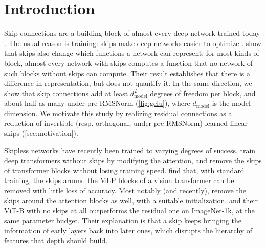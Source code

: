 \documentclass[10pt]{article}
\theoremstyle{definition}
\theoremstyle{remark}
\newcommand{\dm}{d_{\mathrm{model}}}
\begin{document}
\section{Introduction}\label{sec:intro}

Skip connections are a building block of almost every deep network trained today \citep{he2016resnet}. The usual reason is training: skips make deep networks easier to optimize \citep{he2016resnet,balduzzi2017shattered,orhan2018skip}. \citet{mijoski2026worth} show that skips also change which functions a network can represent: for most kinds of block, almost every network with skips computes a function that no network of such blocks without skips can compute. Their result establishes that there is a difference in representation, but does not quantify it. In the same direction, we show that skip connections add at least $\dm^2$ degrees of freedom per block, and about half as many under pre-RMSNorm (\cref{fig:gelu}), where $\dm$ is the model dimension. We motivate this study by realizing residual connections as a reduction of invertible (resp. orthogonal, under pre-RMSNorm) learned linear skips (\cref{sec:motivation}).

Skipless networks have recently been trained to varying degrees of success. \citet{he2023shortcuts} train deep transformers without skips by modifying the attention, and \citet{he2024simplifying} remove the skips of transformer blocks without losing training speed. \citet{ji2025always} find that, with standard training, the skips around the MLP blocks of a vision transformer can be removed with little loss of accuracy. Most notably (and recently), \citet{ji2026cutting} remove the skips around the attention blocks as well, with a suitable initialization, and their ViT-B with no skips at all outperforms the residual one on ImageNet-1k, at the same parameter budget. Their explanation is that a skip keeps bringing the information of early layers back into later ones, which disrupts the hierarchy of features that depth should build.
\end{document}
